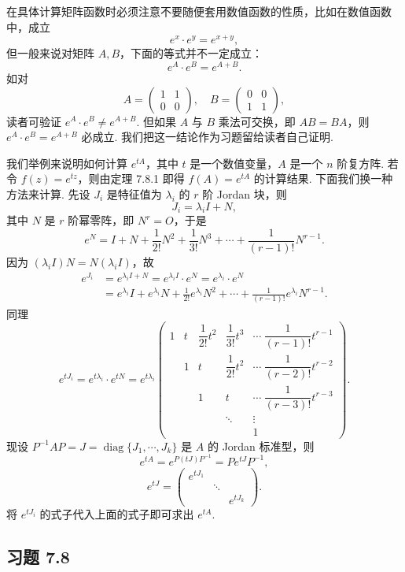 \documentclass[UTF8,12pt,a4paper,fontset=fandol]{ctexart}
\begin{document}
在具体计算矩阵函数时必须注意不要随便套用数值函数的性质，比如在数值函数中，成立
\[
e^x\cdot e^y=e^{x+y},
\]
但一般来说对矩阵 $A,B$，下面的等式并不一定成立：
\[
e^A\cdot e^B=e^{A+B}.
\]
如对
\[
A=\left(\begin{array}{cc}
1 & 1\\
0 & 0
\end{array}\right),\quad
B=\left(\begin{array}{cc}
0 & 0\\
1 & 1
\end{array}\right),
\]
读者可验证 $e^A\cdot e^B\ne e^{A+B}$. 但如果 $A$ 与 $B$ 乘法可交换，即 $AB=BA$，则 $e^A\cdot e^B=e^{A+B}$ 必成立. 我们把这一结论作为习题留给读者自己证明.

我们举例来说明如何计算 $e^{tA}$，其中 $t$ 是一个数值变量，$A$ 是一个 $n$ 阶复方阵. 若令 $f(z)=e^{tz}$，则由定理 7.8.1 即得 $f(A)=e^{tA}$ 的计算结果. 下面我们换一种方法来计算. 先设 $J_i$ 是特征值为 $\lambda_i$ 的 $r$ 阶 Jordan 块，则
\[
J_i=\lambda_iI+N,
\]
其中 $N$ 是 $r$ 阶幂零阵，即 $N^r=O$，于是
\[
e^N=I+N+\frac1{2!}N^2+\frac1{3!}N^3+\cdots+\frac1{(r-1)!}N^{r-1}.
\]
因为 $(\lambda_iI)N=N(\lambda_iI)$，故
\[
\begin{aligned}
e^{J_i}&=e^{\lambda_iI+N}=e^{\lambda_iI}\cdot e^N=e^{\lambda_i}\cdot e^N\\
&=e^{\lambda_i}I+e^{\lambda_i}N+\frac1{2!}e^{\lambda_i}N^2+\cdots+\frac1{(r-1)!}e^{\lambda_i}N^{r-1}.
\end{aligned}
\]
同理
\[
e^{tJ_i}=e^{t\lambda_i}\cdot e^{tN}=e^{t\lambda_i}\left(\begin{array}{ccccc}
1 & t & \dfrac1{2!}t^2 & \dfrac1{3!}t^3 & \cdots\ \dfrac1{(r-1)!}t^{r-1}\\
& 1 & t & \dfrac1{2!}t^2 & \cdots\ \dfrac1{(r-2)!}t^{r-2}\\
& & 1 & t & \cdots\ \dfrac1{(r-3)!}t^{r-3}\\
& & & \ddots & \vdots\\
& & & & 1
\end{array}\right).
\]
现设 $P^{-1}AP=J=\operatorname{diag}\{J_1,\cdots,J_k\}$ 是 $A$ 的 Jordan 标准型，则
\[
e^{tA}=e^{P(tJ)P^{-1}}=Pe^{tJ}P^{-1},
\]
\[
e^{tJ}=\left(\begin{array}{ccc}
e^{tJ_1} & & \\
& \ddots & \\
& & e^{tJ_k}
\end{array}\right).
\]
将 $e^{tJ_i}$ 的式子代入上面的式子即可求出 $e^{tA}$.

\subsection*{习题 7.8}
\end{document}
